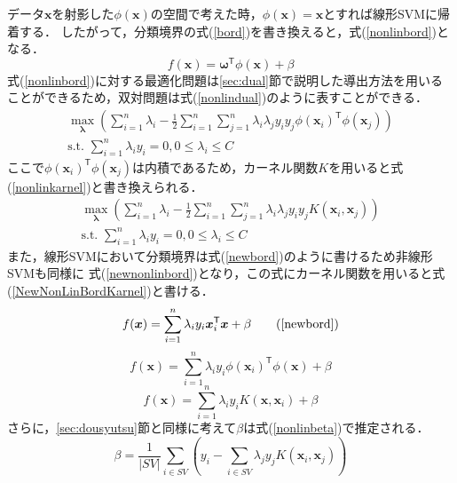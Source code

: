 \documentclass[11pt,a4paper,titlepage]{ltjsarticle}
\begin{document}
データ$\bm{x}$を射影した$\phi(\bm{x})$の空間で考えた時，$\phi(\bm{x}) = \bm{x}$とすれば線形SVMに帰着する．
したがって，分類境界の式(\ref{bord})を書き換えると，式(\ref{nonlinbord})となる．
\begin{equation}
    \label{nonlinbord}
    f(\bm{x}) = \bm{\omega}^\mathsf{T}\phi(\bm{x})+\beta
\end{equation}
式(\ref{nonlinbord})に対する最適化問題は\ref{sec:dual}節で説明した導出方法を用いることができるため，双対問題は式(\ref{nonlindual})のように表すことができる．
\begin{equation}
    \label{nonlindual}
    \begin{gathered}
        \max_{\bm{\lambda}}\left(\sum_{i=1}^{n}\lambda_i-\frac{1}{2}\sum_{i=1}^{n}\sum_{j=1}^{n}\lambda_i\lambda_jy_iy_j\phi(\bm{x}_i)^\mathsf{T}\phi(\bm{x}_j)\right)\\
        \text{s.t. }\sum_{i=1}^{n}\lambda_iy_i=0,0\leq\lambda_i\leq C
    \end{gathered}
\end{equation}
ここで$\phi(\bm{x}_i)^\mathsf{T}\phi(\bm{x}_j)$は内積であるため，カーネル関数$K$を用いると式(\ref{nonlinkarnel})と書き換えられる．
\begin{equation}
    \label{nonlinkarnel}
    \begin{gathered}
        \max_{\bm{\lambda}}\left(\sum_{i=1}^{n}\lambda_i-\frac{1}{2}\sum_{i=1}^{n}\sum_{j=1}^{n}\lambda_i\lambda_jy_iy_jK(\bm{x}_i,\bm{x}_j)\right)\\
        \text{s.t. }\sum_{i=1}^{n}\lambda_iy_i=0,0\leq\lambda_i\leq C
    \end{gathered}
\end{equation}
また，線形SVMにおいて分類境界は式(\ref{newbord})のように書けるため非線形SVMも同様に
式(\ref{newnonlinbord})となり，この式にカーネル関数を用いると式(\ref{NewNonLinBordKarnel})と書ける．
\begin{equation}
    f(\bm{x}) = \sum_{i=1}^{n}\lambda_iy_i\bm{x}_i^\mathsf{T}\bm{x} + \beta \tag{\ref{newbord}}
\end{equation}
\begin{equation}
    \label{newnonlinbord}
    f(\bm{x}) = \sum_{i=1}^{n}\lambda_iy_i\phi(\bm{x}_i)^\mathsf{T}\phi(\bm{x}) + \beta
\end{equation}
\begin{equation}
    \label{NewNonLinBordKarnel}
    f(\bm{x}) = \sum_{i=1}^{n}\lambda_iy_iK(\bm{x},\bm{x}_i) + \beta
\end{equation}
さらに，\ref{sec:dousyutsu}節と同様に考えて$\beta$は式(\ref{nonlinbeta})で推定される．
\begin{equation}
    \label{nonlinbeta}
    \beta = \frac{1}{|SV|}\sum_{i \in SV}\left(y_i - \sum_{i \in SV}\lambda_jy_jK(\bm{x}_i,\bm{x}_j)\right)
\end{equation}
\end{document}
